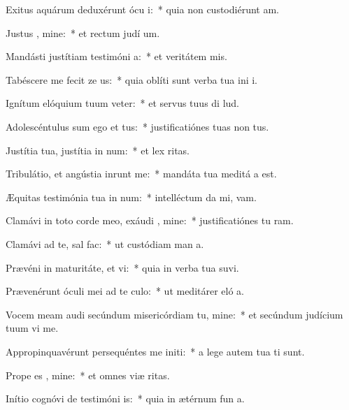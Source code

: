 \item Exitus aquárum deduxérunt ócu i:~* quia non custodiérunt  am.
\item Justus , mine:~* et rectum judí um.
\item Mandásti justítiam testimóni a:~* et veritátem  mis.
\item Tabéscere me fecit ze us:~* quia oblíti sunt verba tua ini i.
\item Ignítum elóquium tuum veter:~* et servus tuus di lud.
\item Adolescéntulus sum ego et tus:~* justificatiónes tuas non  tus.
\item Justítia tua, justítia in num:~* et lex  ritas.
\item Tribulátio, et angústia inrunt me:~* mandáta tua meditá a est.
\item Æquitas testimónia tua in num:~* intelléctum da mi,  vam.
\item Clamávi in toto corde meo, exáudi , mine:~* justificatiónes tu ram.
\item Clamávi ad te, sal  fac:~* ut custódiam man a.
\item Prævéni in maturitáte, et vi:~* quia in verba tua suvi.
\item Prævenérunt óculi mei ad te culo:~* ut meditárer eló a.
\item Vocem meam audi secúndum misericórdiam tu, mine:~* et secúndum judícium tuum vi me.
\item Appropinquavérunt persequéntes me initi:~* a lege autem tua  ti sunt.
\item Prope es , mine:~* et omnes viæ  ritas.
\item Inítio cognóvi de testimóni is:~* quia in ætérnum fun a.
